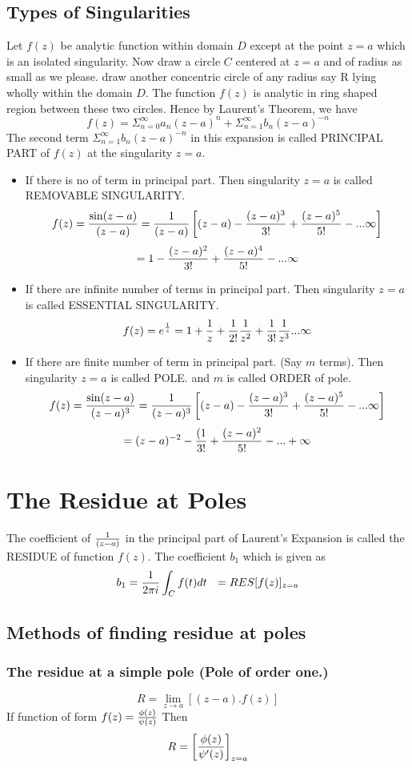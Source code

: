  \subsection{Types of Singularities}
 Let $f(z)$ be analytic function  within domain $D$ except at the point $z=a$ which is an isolated singularity. Now draw a circle $C$ centered at $z=a$ and of radius as small as we please. draw another concentric circle of any radius say R lying wholly within the domain $D$. The function $f(z)$ is analytic in ring shaped region between these two circles. Hence by Laurent's Theorem, we have
 \[f(z) = \Sigma_{n=0}^{\infty} a_n (z-a)^n + \Sigma_{n=1}^{\infty} b_n (z-a)^{-n}\]
 The second term $\Sigma_{n=1}^{\infty} b_n (z-a)^{-n}$ in this expansion is called PRINCIPAL PART of $f(z)$ at the singularity $z=a$.
 
 
\begin{itemize}
	\item  If there is no of term in principal part. Then singularity $z=a$ is called REMOVABLE SINGULARITY.
	\[f(z) = {\sin (z-a) \over (z-a)} = {1 \over (z-a)}\left[(z-a) -{(z-a)^3 \over 3!}+{(z-a)^5 \over 5!} - ... \infty \right] \]
	\[= 1 -{(z-a)^2 \over 3!}+{(z-a)^4 \over 5!} - ... \infty\]
	\item  If there are infinite number of terms in principal part. Then singularity $z=a$ is called ESSENTIAL SINGULARITY.
		\[f(z) = e^{1 \over z} =  1 +{1 \over z}+{1 \over 2!}{1 \over z^2} +{1 \over 3!}{1 \over z^3} ... \infty\]
	\item If there are finite number of term in principal part. (Say $m$ terms). Then singularity $z=a$ is called POLE. and $m$ is called ORDER of pole.  
	\[f(z) = {\sin (z-a) \over (z-a)^3} = {1 \over (z-a)^3}\left[(z-a) -{(z-a)^3 \over 3!}+{(z-a)^5 \over 5!} - ... \infty \right] \]\[= (z-a)^{-2} -{(1 \over 3!} + {(z-a)^2 \over 5!} - ... + \infty \]
\end{itemize}
	\section{The Residue at Poles}
	The coefficient of $1 \over (z-a)$ in the principal part of Laurent's Expansion is called the RESIDUE of function $f(z)$. The coefficient $b_1$ which is given as 
	\[b_1 = {1 \over 2\pi i} \int_C f(t) dt  ~~ = RES[f(z)]_{z=a}\]
\subsection{Methods of finding residue at poles}
 \subsubsection{The residue at a \textbf{simple pole} (Pole of order one.)}
 \[R = \lim_{z\rightarrow a}[(z-a).f(z)]\]
 If function of form $f(z) = {\phi (z) \over \psi (z)}$	 Then 
 \[R = \left[{\phi (z) \over \psi' (z)}\right]_{z=a} \]
 
